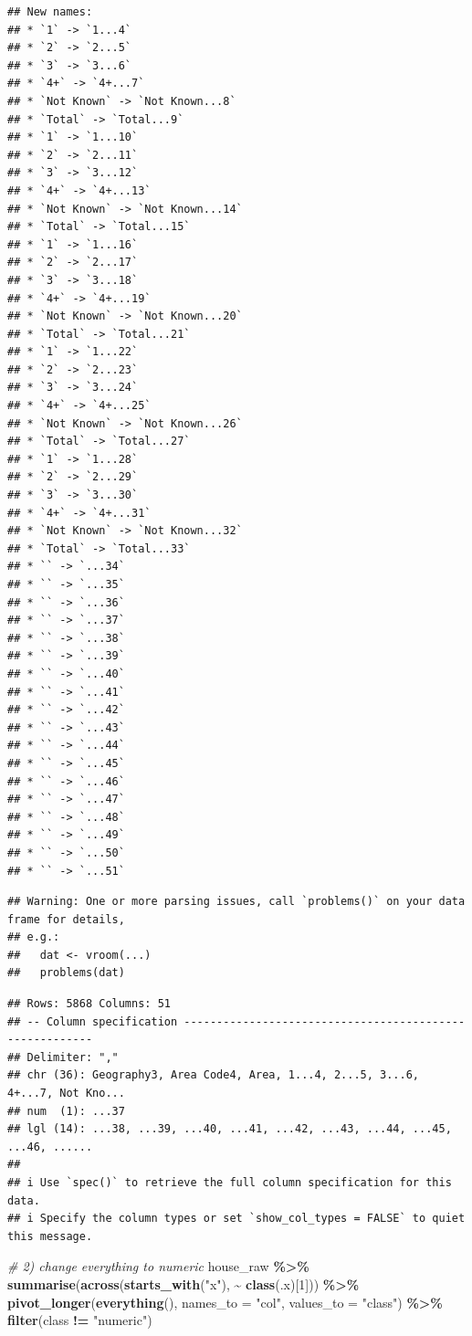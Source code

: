\documentclass[
]{article}
\newenvironment{Shaded}{\begin{snugshade}}{\end{snugshade}}
\newcommand{\AttributeTok}[1]{\textcolor[rgb]{0.13,0.29,0.53}{#1}}
\newcommand{\CommentTok}[1]{\textcolor[rgb]{0.56,0.35,0.01}{\textit{#1}}}
\newcommand{\DecValTok}[1]{\textcolor[rgb]{0.00,0.00,0.81}{#1}}
\newcommand{\FunctionTok}[1]{\textcolor[rgb]{0.13,0.29,0.53}{\textbf{#1}}}
\newcommand{\NormalTok}[1]{#1}
\newcommand{\SpecialCharTok}[1]{\textcolor[rgb]{0.81,0.36,0.00}{\textbf{#1}}}
\newcommand{\StringTok}[1]{\textcolor[rgb]{0.31,0.60,0.02}{#1}}
\begin{document}
\begin{verbatim}
## New names:
## * `1` -> `1...4`
## * `2` -> `2...5`
## * `3` -> `3...6`
## * `4+` -> `4+...7`
## * `Not Known` -> `Not Known...8`
## * `Total` -> `Total...9`
## * `1` -> `1...10`
## * `2` -> `2...11`
## * `3` -> `3...12`
## * `4+` -> `4+...13`
## * `Not Known` -> `Not Known...14`
## * `Total` -> `Total...15`
## * `1` -> `1...16`
## * `2` -> `2...17`
## * `3` -> `3...18`
## * `4+` -> `4+...19`
## * `Not Known` -> `Not Known...20`
## * `Total` -> `Total...21`
## * `1` -> `1...22`
## * `2` -> `2...23`
## * `3` -> `3...24`
## * `4+` -> `4+...25`
## * `Not Known` -> `Not Known...26`
## * `Total` -> `Total...27`
## * `1` -> `1...28`
## * `2` -> `2...29`
## * `3` -> `3...30`
## * `4+` -> `4+...31`
## * `Not Known` -> `Not Known...32`
## * `Total` -> `Total...33`
## * `` -> `...34`
## * `` -> `...35`
## * `` -> `...36`
## * `` -> `...37`
## * `` -> `...38`
## * `` -> `...39`
## * `` -> `...40`
## * `` -> `...41`
## * `` -> `...42`
## * `` -> `...43`
## * `` -> `...44`
## * `` -> `...45`
## * `` -> `...46`
## * `` -> `...47`
## * `` -> `...48`
## * `` -> `...49`
## * `` -> `...50`
## * `` -> `...51`
\end{verbatim}

\begin{verbatim}
## Warning: One or more parsing issues, call `problems()` on your data frame for details,
## e.g.:
##   dat <- vroom(...)
##   problems(dat)
\end{verbatim}

\begin{verbatim}
## Rows: 5868 Columns: 51
## -- Column specification --------------------------------------------------------
## Delimiter: ","
## chr (36): Geography3, Area Code4, Area, 1...4, 2...5, 3...6, 4+...7, Not Kno...
## num  (1): ...37
## lgl (14): ...38, ...39, ...40, ...41, ...42, ...43, ...44, ...45, ...46, ......
## 
## i Use `spec()` to retrieve the full column specification for this data.
## i Specify the column types or set `show_col_types = FALSE` to quiet this message.
\end{verbatim}

\begin{Shaded}
\begin{Highlighting}[]
\CommentTok{\# 2) change everything to numeric}
\NormalTok{house\_raw }\SpecialCharTok{\%\textgreater{}\%}
  \FunctionTok{summarise}\NormalTok{(}\FunctionTok{across}\NormalTok{(}\FunctionTok{starts\_with}\NormalTok{(}\StringTok{"x"}\NormalTok{), }\SpecialCharTok{\textasciitilde{}} \FunctionTok{class}\NormalTok{(.x)[}\DecValTok{1}\NormalTok{])) }\SpecialCharTok{\%\textgreater{}\%}
  \FunctionTok{pivot\_longer}\NormalTok{(}\FunctionTok{everything}\NormalTok{(), }\AttributeTok{names\_to =} \StringTok{"col"}\NormalTok{, }\AttributeTok{values\_to =} \StringTok{"class"}\NormalTok{) }\SpecialCharTok{\%\textgreater{}\%}
  \FunctionTok{filter}\NormalTok{(class }\SpecialCharTok{!=} \StringTok{"numeric"}\NormalTok{)}
\end{Highlighting}
\end{Shaded}
\end{document}
